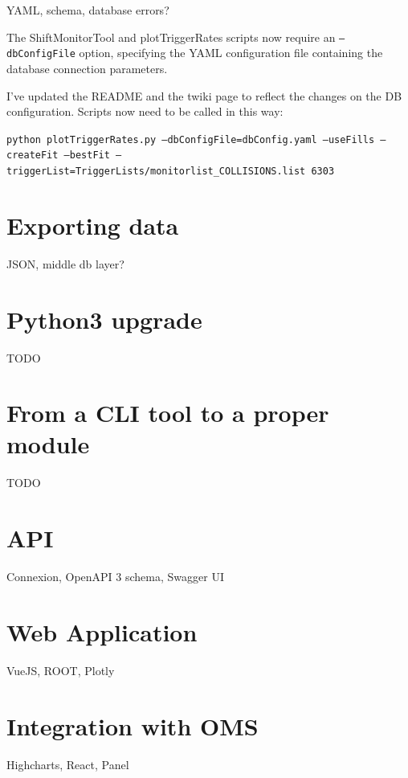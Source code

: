 YAML, schema, database errors?

The ShiftMonitorTool and plotTriggerRates scripts now require an \texttt{--dbConfigFile} option, specifying the YAML configuration file containing the database connection parameters.

I've updated the README and the twiki page to reflect the changes on the DB configuration. Scripts now need to be called in this way:

\texttt{python plotTriggerRates.py --dbConfigFile=dbConfig.yaml --useFills --createFit --bestFit --triggerList=TriggerLists/monitorlist\_COLLISIONS.list 6303}

\section{Exporting data}

JSON, middle db layer?

\section{Python3 upgrade}

TODO

\section{From a CLI tool to a proper module}

TODO

\section{API}

Connexion, OpenAPI 3 schema, Swagger UI

\section{Web Application}

VueJS, ROOT, Plotly

\section{Integration with OMS}

Highcharts, React, Panel


